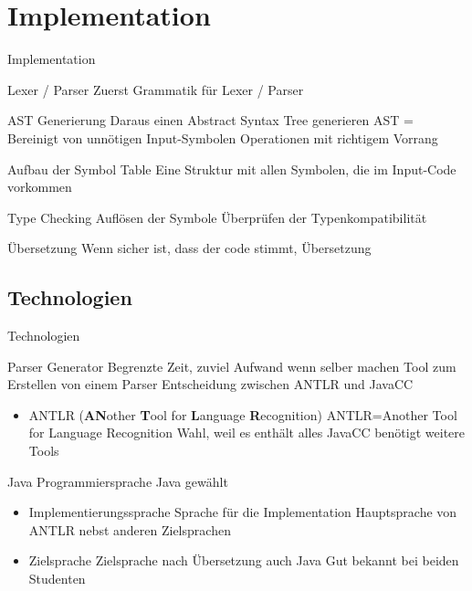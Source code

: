 \section{Implementation}
\begin{frame}[t]{Implementation}

	\begin{bigitemize}[<+->]{3mm}
		\item Lexer / Parser
		 {Zuerst Grammatik für Lexer / Parser}
		\item AST Generierung
		 {Daraus einen Abstract Syntax Tree generieren}
		 {AST = Bereinigt von unnötigen Input-Symbolen}
		 {Operationen mit richtigem Vorrang}
		\item Aufbau der Symbol Table
		 {Eine Struktur mit allen Symbolen, die im Input-Code vorkommen}
		\item Type Checking
		 {Auflösen der Symbole}
		 {Überprüfen der Typenkompatibilität}
		\item Übersetzung
		 {Wenn sicher ist, dass der code stimmt, Übersetzung}
	\end{bigitemize}

\end{frame}

\subsection{Technologien}
\begin{frame}[t]{Technologien}
	\begin{bigitemize}[<+->]{3mm}
		\item Parser Generator
		 {Begrenzte Zeit, zuviel Aufwand wenn selber machen}
		 {Tool zum Erstellen von einem Parser}
		 {Entscheidung zwischen ANTLR und JavaCC}
		\begin{itemize}
			\item ANTLR (\textbf{AN}other \textbf{T}ool for \textbf{L}anguage \textbf{R}ecognition)
			 {ANTLR=Another Tool for Language Recognition}
			 {Wahl, weil es enthält alles}
			 {JavaCC benötigt weitere Tools}
		\end{itemize}

		\item Java 
		 {Programmiersprache Java gewählt}
		\begin{itemize}
			\item Implementierungssprache 
			 {Sprache für die Implementation}
			 {Hauptsprache von ANTLR nebst anderen Zielsprachen}
			\item Zielsprache
			 {Zielsprache nach Übersetzung auch Java}
			 {Gut bekannt bei beiden Studenten}
		\end{itemize}
	\end{bigitemize}
\end{frame}

